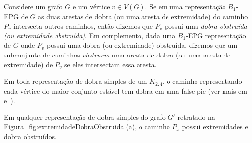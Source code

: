 \begin{definition}
Considere um grafo $G$ e um vértice $v \in V(G)$. Se em uma representação $B_1$-EPG de $G$ as duas arestas de dobra (ou uma aresta de extremidade) do caminho $P_v$ intersecta outros caminhos, então dizemos que  $P_v$ possui uma \emph{dobra obstruída (ou extremidade obstruída)}. 
Em complemento, dada uma $B_1$-EPG representação de $G$ onde $P_v$ possui uma dobra (ou extremidade) obstruída, dizemos que um subconjunto de caminhos \emph{obstruem} uma aresta de dobra (ou uma aresta de extremidade) de  $P_v$ se eles intersectam essa aresta. 
\end{definition}


\begin{fac} \label{fact:k24facts}
Em toda representação de dobra simples de um $K_{2,4}$, o caminho representando cada vértice do maior conjunto estável tem dobra em uma  false pie (ver mais em~\cite{Asinowski2009} e~\cite{daniel2014b}).
\end{fac}


\begin{lema}\label{lem:obstrucao}
Em qualquer representação de dobra simples do grafo  $G'$ retratado na  Figura~\ref{fig:extremidadeDobraObstruida}(a), o caminho $P_x$ possui extremidades e dobra obstruídos.
\end{lema}

